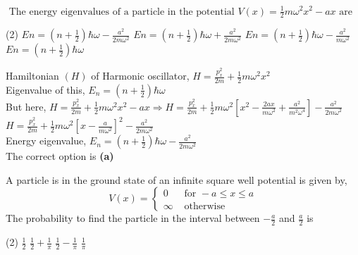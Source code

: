 \begin{enumerate}
\begin{answer}
\end{answer}
\begin{minipage}{\textwidth}
	\item $\text { The energy eigenvalues of a particle in the potential } V(x)=\frac{1}{2} m \omega^{2} x^{2}-a x \text { are }$
\end{minipage}
\begin{tasks}(2)
	\task[\textbf{A.}] $E n=\left(n+\frac{1}{2}\right) \hbar \omega-\frac{a^{2}}{2 m \omega^{2}}$
	\task[\textbf{B.}]$E n=\left(n+\frac{1}{2}\right) \hbar \omega+\frac{a^{2}}{2 m \omega^{2}}$
	\task[\textbf{C.}]$E n=\left(n+\frac{1}{2}\right) \hbar \omega-\frac{a^{2}}{m \omega^{2}}$
	\task[\textbf{D.}]$E n=\left(n+\frac{1}{2}\right) \hbar \omega$
\end{tasks}
\begin{answer}
	Hamiltonian $(H)$ of Harmonic oscillator, $H=\frac{p_{x}^{2}}{2 m}+\frac{1}{2} m \omega^{2} x^{2}$\\
	Eigenvalue of this, $E_{n}=\left(n+\frac{1}{2}\right) \hbar \omega$\\
	But here, $H=\frac{p_{x}^{2}}{2 m}+\frac{1}{2} m \omega^{2} x^{2}-a x \Rightarrow H=\frac{p_{x}^{2}}{2 m}+\frac{1}{2} m \omega^{2}\left[x^{2}-\frac{2 a x}{m \omega^{2}}+\frac{a^{2}}{m^{2} \omega^{4}}\right]-\frac{a^{2}}{2 m \omega^{2}}$\\
	$H=\frac{p_{x}^{2}}{2 m}+\frac{1}{2} m \omega^{2}\left[x-\frac{a}{m \omega^{2}}\right]^{2}-\frac{a^{2}}{2 m \omega^{2}}$\\
	Energy eigenvalue, $E_{n}=\left(n+\frac{1}{2}\right) \hbar \omega-\frac{a^{2}}{2 m \omega^{2}}$\\
	The correct option is \textbf{(a)}	
\end{answer}
\begin{minipage}{\textwidth}
	\item A particle is in the ground state of an infinite square well potential is given by,
	$$
	V(x)= \begin{cases}0 & \text { for }-a \leq x \leq a \\ \infty & \text { otherwise }\end{cases}
	$$
	The probability to find the particle in the interval between $-\frac{a}{2}$ and $\frac{a}{2}$ is
\end{minipage}
\begin{tasks}(2)
	\task[\textbf{A.}] $\frac{1}{2}$ 
	\task[\textbf{B.}]$\frac{1}{2}+\frac{1}{\pi}$
	\task[\textbf{C.}]$\frac{1}{2}-\frac{1}{\pi}$
	\task[\textbf{D.}]$\frac{1}{\pi}$

\end{tasks}
\end{enumerate}

